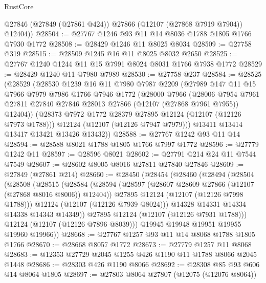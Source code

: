 \begin{lexlean}{RustCore}
\begin{coremodule}
        @27846
        (@27849 (@27861 @424))
        @27866
        (@12107 (@27868 @7919 @7904))
        @12404))
@28504 := @27767 @1246 @93 @11 @14 @8036 @1788 @1805 @1766 @7930 @1772
@28508 := @28429 @1246 @11 @8025 @8034
@28509 := @27758 @319
@28515 := @28509 @1245 @16 @11 @8025 @8032 @2650
@28525 := @27767 @1240 @1244 @11 @15 @7991 @8024 @8031 @1766 @7938 @1772
@28529 := @28429 @1240 @11 @7980 @7989
@28530 := @27758 @237
@28584 := @28525
    (@28529
      (@28530
        @1239
        @16
        @11
        @7980
        @7987
        @2209
        (@27989
          @147
          @11
          @15
          @7966
          @7979
          @7986
          @1766
          @7946
          @1772
          (@28000
            @7966
            (@28006
              @7954
              @7961
              @27811
              @27840
              @27846
              @28013
              @27866
              (@12107 (@27868 @7961 @7955))
              @12404))
          (@28373 @7972 @1772 @28379 @27895 @12124 (@12107 (@12126 @7973 @1788)))
          @12124
          (@12107 (@12126 @7947 @7979)))
        @13411
        @13414
        @13417
        @13421
        @13426
        @13432))
@28588 := @27767 @1242 @93 @11 @14
@28594 := @28588 @8021 @1788 @1805 @1766 @7997 @1772
@28596 := @27779 @1242 @11
@28597 := @28596 @8021
@28602 := @27791 @214 @24 @11 @7544 @7549
@28607 := @28602 @8005 @8016 @27811 @27840 @27846
@28609 := @27849 (@27861 @214)
@28660 := @28450
    (@28454
      (@28460
        (@28494
          (@28504
            (@28508
              (@28515
                (@28584
                  (@28594
                    (@28597 (@28607 @28609 @27866 (@12107 (@27868 @8016 @8006)) @12404))
                    @27895
                    @12124
                    (@12107 (@12126 @7998 @1788)))
                  @12124
                  (@12107 (@12126 @7939 @8024)))
                @14328
                @14331
                @14334
                @14338
                @14343
                @14349))
            @27895
            @12124
            (@12107 (@12126 @7931 @1788)))
          @12124
          (@12107 (@12126 @7896 @8039)))
        @19945
        @19948
        @19951
        @19955
        @19960
        @19966))
@28668 := @27767 @1257 @93 @11 @14 @8068 @1788 @1805 @1766
@28670 := @28668 @8057 @1772
@28673 := @27779 @1257 @11 @8068
@28683 := @12353 @27729 @2045 @1255 @426 @1190 @11 @1788 @8066 @2045 @1448
@28686 := @28303 @426 @1190 @8066
@28692 := @28308 @85 @93 @606 @14 @8064 @1805
@28697 := @27803 @8064 @27807 (@12075 (@12076 @8064))

\end{coremodule}
\end{lexlean}
